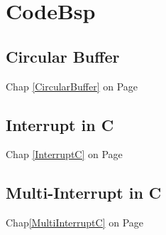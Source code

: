 \section{CodeBsp}
\subsection*{Circular Buffer}
Chap \ref{CircularBuffer} on Page \pageref{CircularBuffer}

\clearpage

\subsection*{Interrupt in C }
Chap \ref{InterruptC} on Page \pageref{InterruptC}


\subsection*{Multi-Interrupt in C }
Chap\ref{MultiInterruptC} on Page \pageref{MultiInterruptC}


